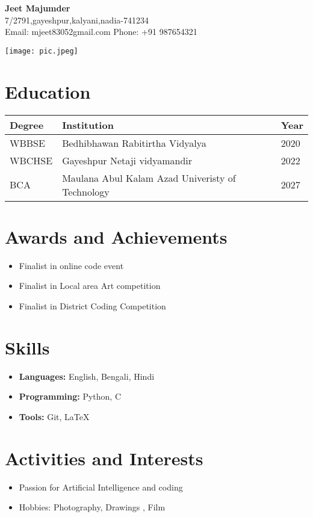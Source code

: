 \documentclass[a4paper,10pt]{article}
\begin{document}
\begin{center}
    {\LARGE \textbf{Jeet Majumder}} \\
    7/2791,gayeshpur,kalyani,nadia-741234 \\
    Email: mjeet83052gmail.com \quad Phone: +91 987654321
\end{center}

\vspace{0 pt}

\begin{flushright}
    \texttt{[image: pic.jpeg]}
\end{flushright}



\section*{Education}
\begin{tabular}{|p{}|p{}|p{}|}
\hline
\textbf{Degree} & \textbf{Institution} & \textbf{Year} \\
\hline
WBBSE & Bedhibhawan Rabitirtha Vidyalya & 2020 \\
\hline
WBCHSE & Gayeshpur Netaji vidyamandir & 2022 \\
\hline
BCA & Maulana Abul Kalam Azad Univeristy of Technology & 2027 \\
\hline
\end{tabular}

\vspace{0.5cm}

\section*{Awards and Achievements}
\begin{itemize}
    \item Finalist in online code event
    \item Finalist in Local area Art competition
    \item Finalist in District Coding Competition
\end{itemize}

\section*{Skills}
\begin{itemize}
    \item \textbf{Languages:} English, Bengali, Hindi
    \item \textbf{Programming:} Python, C
    \item \textbf{Tools:} Git, LaTeX
\end{itemize}

\section*{Activities and Interests}
\begin{itemize}
    \item Passion for Artificial Intelligence and coding
    \item Hobbies: Photography, Drawings , Film
\end{itemize}
\end{document}
